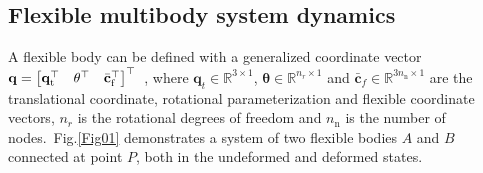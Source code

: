 \subsection{Flexible multibody system dynamics}

A flexible body can be defined with a generalized coordinate vector $\mathbf{q} = {\begin{bmatrix}
\mathbf{q}_{{\mathrm{t}}}^{\top} &
    {\mathbf{\theta}}^{\top} &
{\bar{\mathbf{c}}}_{{\mathrm{f}}}^{\top} 
\end{bmatrix}}^{\top}$~\cite{shabana2020dynamics}, where \( \mathbf{q}_{t} \in \mathbb{R}^{3 \times 1} \), \( \boldsymbol{\theta} \in \mathbb{R}^{n_r \times 1} \) and  \( \bar{\mathbf{c}}_{f} \in \mathbb{R}^{3n_{\text{n}} \times 1} \) are the translational coordinate, rotational parameterization and flexible coordinate vectors, $n_r$ is the rotational degrees of freedom and $n_{\text{n}}$ is the number of nodes.~Fig.\ref{Fig01} demonstrates a system of two flexible bodies \( A \) and \( B \) connected at point \( P \), both in the undeformed and deformed states. 


